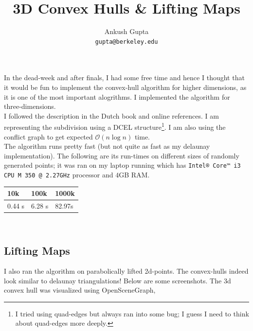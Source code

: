\documentclass[12pt]{article}
\title{\textbf{3D Convex Hulls \& Lifting Maps}}
\author{Ankush Gupta\\\texttt{gupta@berkeley.edu}}
\date{}
\begin{document}
\maketitle

In the dead-week and after finals, I had some free time and hence I thought that it would be fun to implement the convex-hull algorithm for higher dimensions, as it is one of the most important alogrithms. I implemented the algorithm for three-dimensions.\\

I followed the description in the Dutch book and online references. I am representing the subdivision using a DCEL structure\footnote{ I tried using quad-edges but always ran into some bug; I guess I need to think about quad-edges more deeply.}. I am also using the conflict graph to get expected $\mathcal{O}(n\log n)$ time.\\

The algorithm runs pretty fast (but not quite as fast as my delaunay implementation). The following are its run-times on different sizes of randomly generated points; it was ran on my laptop running which has \texttt{Intel® Core™ i3 CPU M 350 @ 2.27GHz} processor and $4$GB RAM.

\begin{center}
\begin{tabular}{l|l|l}
	10k & 100k & 1000k\\\hline
	0.44 s & 6.28 s & 82.97s\\
\end{tabular}\\
\end{center}


\subsection*{Lifting Maps}
I also ran the algorithm on parabolically lifted 2d-points. The convex-hulls indeed look similar to delaunay triangulations! Below are some screenshots. The 3d convex hull was visualized using OpenSceneGraph,
\end{document}
